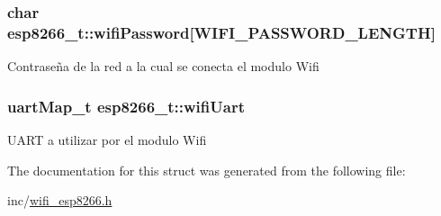 \subsubsection[{\texorpdfstring{wifi\+Password}{wifiPassword}}]{\setlength{\rightskip}{0pt plus 5cm}char esp8266\+\_\+t\+::wifi\+Password\mbox{[}{\bf W\+I\+F\+I\+\_\+\+P\+A\+S\+S\+W\+O\+R\+D\+\_\+\+L\+E\+N\+G\+TH}\mbox{]}}\hypertarget{structesp8266__t_ad9b7f490ac9888aabd0b0b3a78e0dcfe}{}\label{structesp8266__t_ad9b7f490ac9888aabd0b0b3a78e0dcfe}
Contraseña de la red a la cual se conecta el modulo Wifi 
\subsubsection[{\texorpdfstring{wifi\+Uart}{wifiUart}}]{\setlength{\rightskip}{0pt plus 5cm}uart\+Map\+\_\+t esp8266\+\_\+t\+::wifi\+Uart}\hypertarget{structesp8266__t_abc2b749b32780c2d476d3968c984d0a8}{}\label{structesp8266__t_abc2b749b32780c2d476d3968c984d0a8}
U\+A\+RT a utilizar por el modulo Wifi 

The documentation for this struct was generated from the following file\+:\begin{DoxyCompactItemize}
\item 
inc/\hyperlink{wifi__esp8266_8h}{wifi\+\_\+esp8266.\+h}\end{DoxyCompactItemize}
